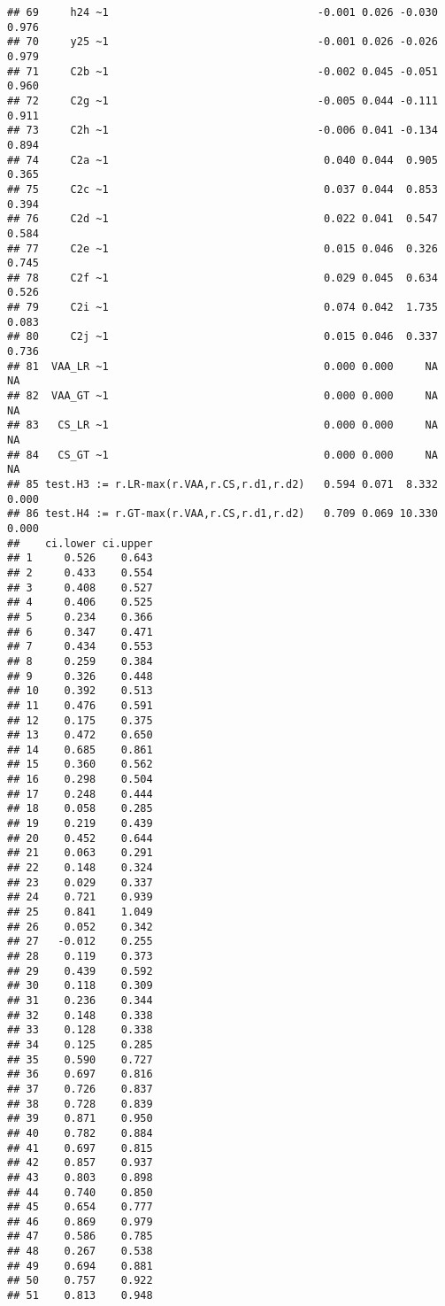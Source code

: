 \documentclass[
]{article}
\begin{document}
\begin{verbatim}
## 69     h24 ~1                                 -0.001 0.026 -0.030  0.976
## 70     y25 ~1                                 -0.001 0.026 -0.026  0.979
## 71     C2b ~1                                 -0.002 0.045 -0.051  0.960
## 72     C2g ~1                                 -0.005 0.044 -0.111  0.911
## 73     C2h ~1                                 -0.006 0.041 -0.134  0.894
## 74     C2a ~1                                  0.040 0.044  0.905  0.365
## 75     C2c ~1                                  0.037 0.044  0.853  0.394
## 76     C2d ~1                                  0.022 0.041  0.547  0.584
## 77     C2e ~1                                  0.015 0.046  0.326  0.745
## 78     C2f ~1                                  0.029 0.045  0.634  0.526
## 79     C2i ~1                                  0.074 0.042  1.735  0.083
## 80     C2j ~1                                  0.015 0.046  0.337  0.736
## 81  VAA_LR ~1                                  0.000 0.000     NA     NA
## 82  VAA_GT ~1                                  0.000 0.000     NA     NA
## 83   CS_LR ~1                                  0.000 0.000     NA     NA
## 84   CS_GT ~1                                  0.000 0.000     NA     NA
## 85 test.H3 := r.LR-max(r.VAA,r.CS,r.d1,r.d2)   0.594 0.071  8.332  0.000
## 86 test.H4 := r.GT-max(r.VAA,r.CS,r.d1,r.d2)   0.709 0.069 10.330  0.000
##    ci.lower ci.upper
## 1     0.526    0.643
## 2     0.433    0.554
## 3     0.408    0.527
## 4     0.406    0.525
## 5     0.234    0.366
## 6     0.347    0.471
## 7     0.434    0.553
## 8     0.259    0.384
## 9     0.326    0.448
## 10    0.392    0.513
## 11    0.476    0.591
## 12    0.175    0.375
## 13    0.472    0.650
## 14    0.685    0.861
## 15    0.360    0.562
## 16    0.298    0.504
## 17    0.248    0.444
## 18    0.058    0.285
## 19    0.219    0.439
## 20    0.452    0.644
## 21    0.063    0.291
## 22    0.148    0.324
## 23    0.029    0.337
## 24    0.721    0.939
## 25    0.841    1.049
## 26    0.052    0.342
## 27   -0.012    0.255
## 28    0.119    0.373
## 29    0.439    0.592
## 30    0.118    0.309
## 31    0.236    0.344
## 32    0.148    0.338
## 33    0.128    0.338
## 34    0.125    0.285
## 35    0.590    0.727
## 36    0.697    0.816
## 37    0.726    0.837
## 38    0.728    0.839
## 39    0.871    0.950
## 40    0.782    0.884
## 41    0.697    0.815
## 42    0.857    0.937
## 43    0.803    0.898
## 44    0.740    0.850
## 45    0.654    0.777
## 46    0.869    0.979
## 47    0.586    0.785
## 48    0.267    0.538
## 49    0.694    0.881
## 50    0.757    0.922
## 51    0.813    0.948

\end{verbatim}
\end{document}
